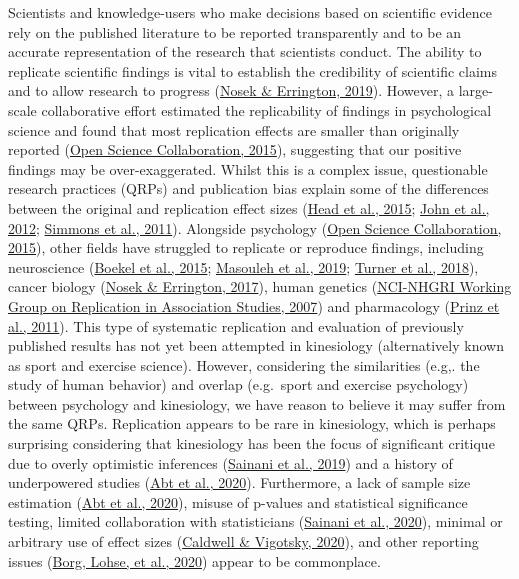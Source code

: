 \documentclass[]{cik}%
\begin{document}
Scientists and knowledge-users who make decisions based on scientific
evidence rely on the published literature to be reported transparently
and to be an accurate representation of the research that scientists
conduct. The ability to replicate scientific findings is vital to
establish the credibility of scientific claims and to allow research to
progress (\protect\hyperlink{ref-NosekErrington2019}{Nosek \& Errington,
2019}). However, a large-scale collaborative effort estimated the
replicability of findings in psychological science and found that most
replication effects are smaller than originally reported
(\protect\hyperlink{ref-collaboration_estimating_2015}{Open Science
Collaboration, 2015}), suggesting that our positive findings may be
over-exaggerated. Whilst this is a complex issue, questionable research
practices (QRPs) and publication bias explain some of the differences
between the original and replication effect sizes
(\protect\hyperlink{ref-head_extent_2015}{Head et al., 2015};
\protect\hyperlink{ref-John_Loewenstein_Prelec_2012}{John et al., 2012};
\protect\hyperlink{ref-simmons_false-positive_2011}{Simmons et al.,
2011}). Alongside psychology
(\protect\hyperlink{ref-collaboration_estimating_2015}{Open Science
Collaboration, 2015}), other fields have struggled to replicate or
reproduce findings, including neuroscience
(\protect\hyperlink{ref-Boekel_Wagenmakers_Belay_Verhagen_Brown_Forstmann_2015}{Boekel
et al., 2015}; \protect\hyperlink{ref-Kharabian_Genon_2019}{Masouleh et
al., 2019};
\protect\hyperlink{ref-Turner_Paul_Miller_Barbey_2018}{Turner et al.,
2018}), cancer biology
(\protect\hyperlink{ref-Nosek_Errington_2017}{Nosek \& Errington,
2017}), human genetics (\protect\hyperlink{ref-chanock_2007}{NCI-NHGRI
Working Group on Replication in Association Studies, 2007}) and
pharmacology
(\protect\hyperlink{ref-Prinz_Schlange_Asadullah_2011}{Prinz et al.,
2011}). This type of systematic replication and evaluation of previously
published results has not yet been attempted in kinesiology
(alternatively known as sport and exercise science). However,
considering the similarities (e.g,. the study of human behavior) and
overlap (e.g.~sport and exercise psychology) between psychology and
kinesiology, we have reason to believe it may suffer from the same QRPs.
Replication appears to be rare in kinesiology, which is perhaps
surprising considering that kinesiology has been the focus of
significant critique due to overly optimistic inferences
(\protect\hyperlink{ref-Sainani_Lohse_Jones_Vickers_2019}{Sainani et
al., 2019}) and a history of underpowered studies
(\protect\hyperlink{ref-Abt_Boreham_Davison_Jackson_Nevill_Wallace_Williams_2020}{Abt
et al., 2020}). Furthermore, a lack of sample size estimation
(\protect\hyperlink{ref-Abt_Boreham_Davison_Jackson_Nevill_Wallace_Williams_2020}{Abt
et al., 2020}), misuse of p-values and statistical significance testing,
limited collaboration with statisticians
(\protect\hyperlink{ref-sainani2020}{Sainani et al., 2020}), minimal or
arbitrary use of effect sizes
(\protect\hyperlink{ref-Caldwell_Vigotsky_2020}{Caldwell \& Vigotsky,
2020}), and other reporting issues
(\protect\hyperlink{ref-Borg_Lohse_Sainani_2020}{Borg, Lohse, et al.,
2020}) appear to be commonplace.
\end{document}
